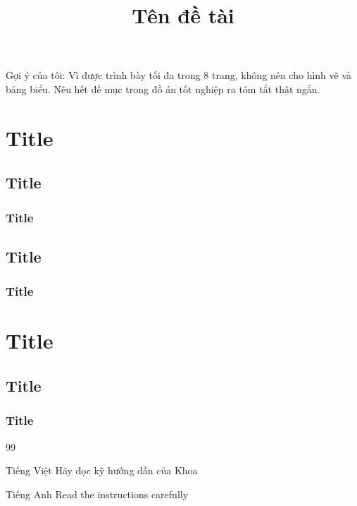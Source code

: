 \documentclass[summary]{femathesis}
\begin{document}
\title{Tên đề tài}
\makecovers


Gợi ý của tôi: Vì được trình bày tối đa trong 8 trang, không nên cho hình vẽ và bảng biểu. Nêu hết đề mục trong đồ án tốt nghiệp ra tóm tắt thật ngắn.







\chapter{Title}
\section{Title}
\subsection{Title}
\section{Title}
\subsection{Title}


\chapter{Title}
\section{Title}
\subsection{Title}





\begin{thebibliography}{99}
\begin{bibsection}{Tiếng Việt}
    Hãy đọc kỹ hướng dẫn của Khoa
\end{bibsection}

\begin{bibsection}{Tiếng Anh}
	Read the instructions carefully
\end{bibsection}
\end{thebibliography}
\end{document}
